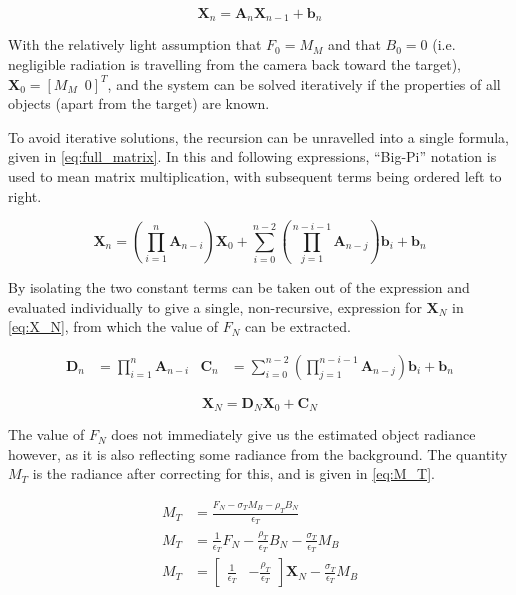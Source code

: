 \documentclass[11pt,a4paper]{article}
\begin{document}
\begin{equation}\label{eq:mat}
	\bm{X}_{n} = \bm{A}_n \bm{X}_{n-1} + \bm{b}_n
\end{equation}

With the relatively light assumption that $ F_0 = M_M $ and that $ B_0 = 0 $ (i.e. negligible radiation is travelling from the camera back toward the target), $ \bm{X}_0 = \left[ M_M \enspace 0\right]^T$, and the system can be solved iteratively if the properties of all objects (apart from the target) are known.

To avoid iterative solutions, the recursion can be unravelled into a single formula, given in \cref{eq:full_matrix}. In this and following expressions, ``Big-Pi'' notation is used to mean matrix multiplication, with subsequent terms being ordered left to right.

\begin{equation}\label{eq:full_matrix}
	\bm{X}_n = \left(\prod_{i=1}^n \bm{A}_{n-i}\right) \bm{X}_0 + \sum_{i=0}^{n-2} \left( \prod_{j=1}^{n-i-1} \bm{A}_{n-j} \right) \bm{b}_i + \bm{b}_n
\end{equation}

By isolating the two constant terms can be taken out of the expression and evaluated individually to give a single, non-recursive, expression for $ \bm{X}_N $ in \cref{eq:X_N}, from which the value of $ F_N $ can be extracted.

\begin{align*}
	\bm{D}_n &= \prod_{i=1}^n \bm{A}_{n-i} &
	\bm{C}_n &= \sum_{i=0}^{n-2} \left( \prod_{j=1}^{n-i-1} \bm{A}_{n-j} \right) \bm{b}_i + \bm{b}_n
\end{align*}

\begin{equation}\label{eq:X_N}
\bm{X}_{N} = \bm{D}_N \bm{X}_0 + \bm{C}_N
\end{equation}

The value of $ F_N $ does not immediately give us the estimated object radiance however, as it is also reflecting some radiance from the background. The quantity $ M_T $ is the radiance after correcting for this, and is given in \cref{eq:M_T}.

\begin{align}
	M_T &= \frac{F_N - \sigma_T M_B - \rho_T B_N}{\epsilon_T} \nonumber\\
	M_T &= \frac{1}{\epsilon_T} F_N - \frac{\rho_T}{\epsilon_T} B_N - \frac{\sigma_T}{\epsilon_T} M_B \nonumber\\
	M_T &= \begin{bmatrix} \frac{1}{\epsilon_T} & - \frac{\rho_T}{\epsilon_T} \end{bmatrix} \bm{X}_{N} - \frac{\sigma_T}{\epsilon_T} M_B \label{eq:M_T}
\end{align}
\end{document}
